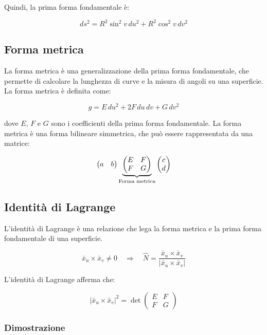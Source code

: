 Quindi, la prima forma fondamentale è:

$$
ds^2 = R^2 \sin^2 v\, du^2 + R^2 \cos^2 v\, dv^2
$$

\subsection{Forma metrica}

La forma metrica è una generalizzazione della prima forma fondamentale, che permette di calcolare la lunghezza di curve e la misura di angoli su una superficie. La forma metrica è definita come:

$$
g = E\,du^2 + 2F\,du\,dv + G\,dv^2
$$

dove $E$, $F$ e $G$ sono i coefficienti della prima forma fondamentale. La forma metrica è una forma bilineare simmetrica, che può essere rappresentata da una matrice:

$$
\begin{pmatrix}
    a & b \\
\end{pmatrix}
\underbrace{
\begin{pmatrix}
E & F \\
F & G
\end{pmatrix}
}_{\small \text{Forma metrica}}
\begin{pmatrix}
    c \\
    d
\end{pmatrix}
$$

\subsection{Identità di Lagrange}

L'identità di Lagrange è una relazione che lega la forma metrica e la prima forma fondamentale di una superficie.

$$
\bar x_u \times \bar x_v \neq 0 \quad \Rightarrow \quad \hat N = \dfrac{\bar x_u \times \bar x_v}{|\bar x_u \times \bar x_v|}
$$

L'identità di Lagrange afferma che:

$$
|\bar x_u \times \bar x_v|^2 =
\det
\begin{pmatrix}
    E & F \\
    F & G
\end{pmatrix}
$$

\subsubsection{Dimostrazione}

